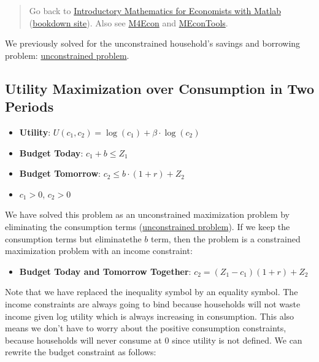 \documentclass[
]{book}
\providecommand{\tightlist}{%
  \setlength{\itemsep}{0pt}\setlength{\parskip}{0pt}}
\begin{document}
\begin{quote}
Go back to \href{https://math4econ.github.io/}{Introductory Mathematics for Economists with Matlab} (\href{https://math4econ.github.io/bookdown}{bookdown site}). Also see \href{http://fanwangecon.github.io/M4Econ}{M4Econ} and \href{https://fanwangecon.github.io/MEconTools/}{MEconTools}.
\end{quote}

We previously solved for the unconstrained household's savings and
borrowing problem: \href{https://math4econ.github.io/derivative_application/K_save_households.html}{unconstrained
problem}.

\hypertarget{utility-maximization-over-consumption-in-two-periods}{%
\subsection{Utility Maximization over Consumption in Two Periods}\label{utility-maximization-over-consumption-in-two-periods}}

\begin{itemize}
\item
  \textbf{Utility}: \(U(c_1 ,c_2 )=\log (c_1 )+\beta \cdot \log (c_2 )\)
\item
  \textbf{Budget Today}: \(c_1 +b\le Z_1\)
\item
  \textbf{Budget Tomorrow}: \(c_2 \le b\cdot (1+r)+Z_2\)
\item
  \(c_1 >0\), \(c_2 >0\)
\end{itemize}

We have solved this problem as an unconstrained maximization problem by
eliminating the consumption terms (\href{https://math4econ.github.io/derivative_application/K_save_households.html}{unconstrained
problem}).
If we keep the consumption terms but eliminatethe \(b\) term, then the
problem is a constrained maximization problem with an income constraint:

\begin{itemize}
\tightlist
\item
  \textbf{Budget Today and Tomorrow Together}: \(c_2 =(Z_1 -c_1 )(1+r)+Z_2\)
\end{itemize}

Note that we have replaced the inequality symbol by an equality symbol.
The income constraints are always going to bind because households will
not waste income given log utility which is always increasing in
consumption. This also means we don't have to worry about the positive
consumption constraints, because households will never consume at 0
since utility is not defined. We can rewrite the budget constraint as
follows:
\end{document}

